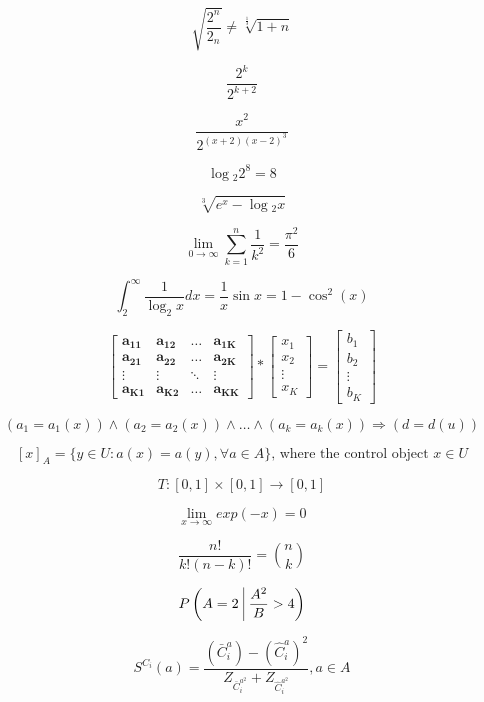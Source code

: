 \documentclass[11pt, a4paper]{article}
\begin{document}
\begin{equation}
    \sqrt{ \frac{2^{n}}{2_n} } \neq \sqrt[\frac{1}{3}]{1+n}
\end{equation}

\begin{equation}
    \frac{2^{k}}{2^{k+2}}
\end{equation}

\begin{equation}
    \frac{x^2}{2^{(x+2)(x-2)^3}}
\end{equation}

\begin{equation}
    \log{_2}{2^8} = 8
\end{equation}

\begin{equation}
    \sqrt[3]{e^x - \log{_2}{x}}
\end{equation}

\begin{equation}
    \lim _{0 \to \infty} \sum_{k=1}^{n} \frac{1}{k^2} = \frac{\pi^2}{6}
\end{equation}

\begin{equation}
    \int_{2}^{\infty} \frac{1}{\log_{2}x} dx = \frac{1}{x} \sin{x} = 1 - \cos^2(x)
\end{equation}

\begin{equation}
    \mathbf{
    \left[ \begin{array}{cccc}
        a_{11} & a_{12} & \ldots & a_{1K}  \\
        a_{21} & a_{22} & \ldots & a_{2K}  \\
        \vdots & \vdots & \ddots & \vdots  \\
        a_{K1} & a_{K2} & \ldots & a_{KK}
    \end{array} \right]}
    *
    \left[ \begin{array}{c}
        x_1  \\
        x_2  \\
        \vdots \\
        x_K
    \end{array} \right]
    =
    \left[ \begin{array}{c}
        b_1  \\
        b_2  \\
        \vdots \\
        b_K
    \end{array} \right]
\end{equation}

$$ (a_1 = a_1(x)) \wedge (a_2 = a_2(x)) \wedge \ldots \wedge (a_k = a_k(x)) \Rightarrow (d = d(u)) $$

$$ [x]_A = \{y \in U : a(x) = a(y), \forall a \in A \} \textrm{, where the control object } x \in U $$

$$ T : [0,1] \times [0,1] \rightarrow [0,1] $$

$$ \lim_{x \to \infty }{exp(-x)} = 0 $$

$$ \frac{n!}{k!(n-k)!} = {n \choose k}$$

$$ P\left( A = 2 \ \vline \ \frac{A^2}{B} > 4 \right) $$

$$ S^{C_i}(a) = \frac{(\bar{C}_i^a) - (\hat{C}_i^a)^2}{Z_{\bar{C}_i^{a^2}} + Z_{\hat{C}_i^{a^2}}}, a \in A $$
\end{document}
